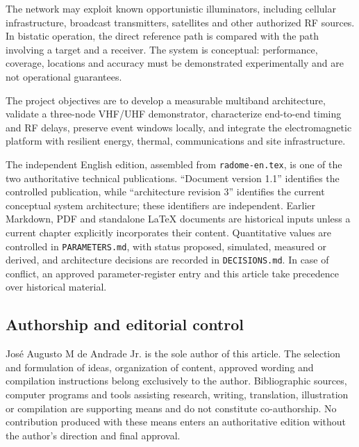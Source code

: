The network may exploit known opportunistic illuminators, including cellular infrastructure, broadcast transmitters, satellites and other authorized RF sources. In bistatic operation, the direct reference path is compared with the path involving a target and a receiver. The system is conceptual: performance, coverage, locations and accuracy must be demonstrated experimentally and are not operational guarantees.

The project objectives are to develop a measurable multiband architecture, validate a three-node VHF/UHF demonstrator, characterize end-to-end timing and RF delays, preserve event windows locally, and integrate the electromagnetic platform with resilient energy, thermal, communications and site infrastructure.

The independent English edition, assembled from \texttt{radome-en.tex}, is one of the two authoritative technical publications. ``Document version 1.1'' identifies the controlled publication, while ``architecture revision 3'' identifies the current conceptual system architecture; these identifiers are independent. Earlier Markdown, PDF and standalone LaTeX documents are historical inputs unless a current chapter explicitly incorporates their content. Quantitative values are controlled in \texttt{PARAMETERS.md}, with status proposed, simulated, measured or derived, and architecture decisions are recorded in \texttt{DECISIONS.md}. In case of conflict, an approved parameter-register entry and this article take precedence over historical material.

\subsection{Authorship and editorial control}

José Augusto M de Andrade Jr. is the sole author of this article. The selection and formulation of ideas, organization of content, approved wording and compilation instructions belong exclusively to the author. Bibliographic sources, computer programs and tools assisting research, writing, translation, illustration or compilation are supporting means and do not constitute co-authorship. No contribution produced with these means enters an authoritative edition without the author's direction and final approval.
